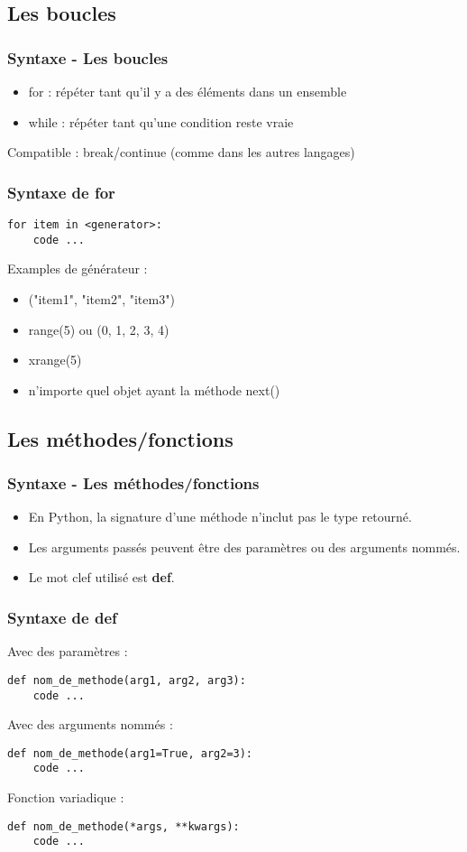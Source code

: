 \subsection{Les boucles}
\begin{frame}[fragile]
  \frametitle{Syntaxe - Les boucles}
  \begin{itemize}
  \item for : répéter tant qu'il y a des éléments dans un ensemble
  \item while : répéter tant qu'une condition reste vraie
  \end{itemize}

Compatible : break/continue (comme dans les autres langages)
\end{frame}

\begin{frame}[fragile]
  \frametitle{Syntaxe de for}
  \begin{lstlisting}
for item in <generator>:
    code ...
  \end{lstlisting}
Examples de générateur :
  \begin{itemize}
  \item ("item1", "item2", "item3")
  \item range(5) ou (0, 1, 2, 3, 4)
  \item xrange(5)
  \item n'importe quel objet ayant la méthode next()
  \end{itemize}
\end{frame}

\subsection{Les méthodes/fonctions}
\begin{frame}[fragile]
  \frametitle{Syntaxe - Les méthodes/fonctions}
  \begin{itemize}
    \item En Python, la signature d'une méthode n'inclut pas le type retourné.
    \item Les arguments passés peuvent être des paramètres ou des arguments nommés.
    \item Le mot clef utilisé est {\bf def}.
  \end{itemize}
\end{frame}

\begin{frame}[fragile]
  \frametitle{Syntaxe de def}
Avec des paramètres :
  \begin{lstlisting}
def nom_de_methode(arg1, arg2, arg3):
    code ...
  \end{lstlisting}
Avec des arguments nommés :
  \begin{lstlisting}
def nom_de_methode(arg1=True, arg2=3):
    code ...
  \end{lstlisting}
Fonction variadique :
  \begin{lstlisting}
def nom_de_methode(*args, **kwargs):
    code ...
  \end{lstlisting}
\end{frame}

